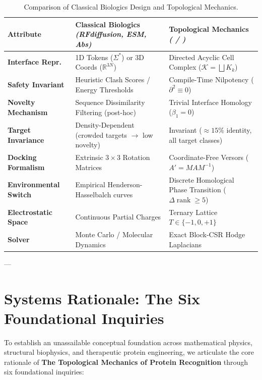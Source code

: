 \begin{table}[t]
\centering
\small
\renewcommand{\arraystretch}{1.25}
\setlength{\tabcolsep}{4pt}
\begin{tabular}{@{} l p{4.8cm} p{5.8cm} @{}}
\toprule
\textbf{Attribute} &
\textbf{Classical Biologics} \newline
\textit{(RFdiffusion, ESM, Abs)} &
\textbf{Topological Mechanics} \newline
\textit{(\ToposLang{} / \PLQ{})} \\
\midrule
\textbf{Interface Repr.} &
  1D Tokens ($\Sigma^*$) or 3D Coords ($\mathbb{R}^{3N}$) &
  Directed Acyclic Cell Complex ($\mathcal{K} = \bigsqcup K_k$) \\
\textbf{Safety Invariant} &
  Heuristic Clash Scores / Energy Thresholds &
  Compile-Time Nilpotency ($\partial^2 \equiv 0$) \\
\textbf{Novelty Mechanism} &
  Sequence Dissimilarity Filtering (post-hoc) &
  Trivial Interface Homology ($\beta_1 = 0$) \\
\textbf{Target Invariance} &
  Density-Dependent (crowded targets $\to$ low novelty) &
  Invariant ($\approx 15\%$ identity, all target classes) \\
\textbf{Docking Formalism} &
  Extrinsic $3{\times}3$ Rotation Matrices &
  Coordinate-Free Versors ($A' = M A M^{-1}$) \\
\textbf{Environmental Switch} &
  Empirical Henderson-Hasselbalch curves &
  Discrete Homological Phase Transition
  ($\Delta\operatorname{rank} \ge 5$) \\
\textbf{Electrostatic Space} &
  Continuous Partial Charges &
  Ternary Lattice $T \in \{-1, 0, +1\}$ \\
\textbf{Solver} &
  Monte Carlo / Molecular Dynamics &
  Exact Block-CSR Hodge Laplacians \\
\bottomrule
\end{tabular}
\caption{Comparison of Classical Biologics Design and Topological Mechanics.}
\label{tab:paradigm_comparison}
\end{table}

---

\section{Systems Rationale: The Six Foundational Inquiries}
\label{sec:systems_rationale}

To establish an unassailable conceptual foundation across mathematical physics, structural biophysics, and therapeutic protein engineering, we articulate the core rationale of \textbf{The Topological Mechanics of Protein Recognition} through six foundational inquiries:

